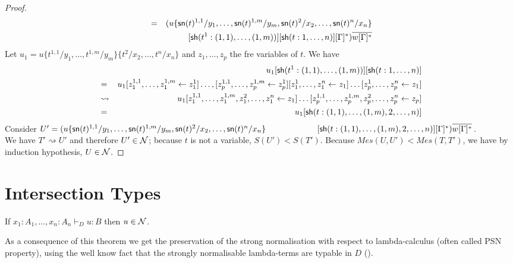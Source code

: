 \documentclass{llncs} %
\newif\ifnonotes\nonotesfalse
\newcommand{\TODO}[1]{\ifnonotes\else{\color{red}    \noindent{\bf TODO }#1}\fi}
\begin{document}
\begin{proof}
\begin{eqnarray*}
    & = & (u\{{\mathsf{sn}}(t)^{1,1}/y_1,\dots,{\mathsf{sn}}(t)^{1,m}/y_m, {\mathsf{sn}}(t)^2/x_2,\dots,{\mathsf{sn}}(t)^n/x_n\} \\
    &   & [{\mathsf{sh}} (t^1:(1,1),\dots,(1,m))][{\mathsf{sh}} (t:1,\dots,n)][\Gamma]^*)\overline{w[\Gamma]^*}
\end{eqnarray*}
%
Let $u_1 = u\{t^{1,1}/y_1,\dots,t^{1,m}/y_m\}\{t^2/x_2,\dots,t^n/x_n\}$ and $z_1,\dots,z_p$ the fre variables of $t$. We have
%
\begin{eqnarray*}
  &                   & u_1[{\mathsf{sh}} (t^1:(1,1),\dots,(1,m))][{\mathsf{sh}} (t:1,\dots,n)] \\
  & =                 & u_1[z_1^{1,1}, \dots, z_1^{1,m} \leftarrow z_1^1]\dots, [z_p^{1,1}, \dots, z_p^{1,m} \leftarrow z_p^1][z_1^1,\dots,z_1^n\leftarrow z_1]\dots [z_p^1,\dots,z_p^n\leftarrow z_1] \\
  & \rightsquigarrow  & u_1[z_1^{1,1}, \dots, z_1^{1,m}, z_1^2,\dots,z_1^n\leftarrow z_1]\dots [z_p^{1,1}, \dots, z_p^{1,m}, z_p^2,\dots,z_p^n\leftarrow z_p] \\
  &  =                & u_1[{\mathsf{sh}} (t:(1,1),\dots,(1,m),2,\dots,n)]
\end{eqnarray*}
Consider $U' = (u\{{\mathsf{sn}}(t)^{1,1}/y_1,\dots,{\mathsf{sn}}(t)^{1,m}/y_m, {\mathsf{sn}}(t)^2/x_2,\dots,{\mathsf{sn}}(t)^n/x_n\} \\
\hspace*{62pt}[{\mathsf{sh}} (t:(1,1),\dots,(1,m),2,\dots,n)][\Gamma]^*)\overline{w[\Gamma]^*}$.
\\
We have $T'\rightsquigarrow U'$ and therefore $U'\in\mathcal{N}$; because $t$ is not a variable, $S(U')<S(T')$.
Because $Mes(U,U') < Mes(T,T')$, we have by induction hypothesis, $U\in\mathcal{N}$.


\end{proof}





\section{Intersection Types}

\begin{theorem}\label{thm:SND}
If $x_1:A_1,\dots, x_n:A_n \vdash_D u:B$ then $u \in \mathcal{N}$.
\end{theorem}

\noindent
As a consequence of this theorem we get the preservation of the strong normalisation with respect to lambda-calculus (often called PSN property), using the well know fact that the strongly normalisable lambda-terms are typable in $D$ (\cite{Coppo-DezaniCiancaglini-1980,Pottinger-1980,Krivine-1993}).
\end{document}
